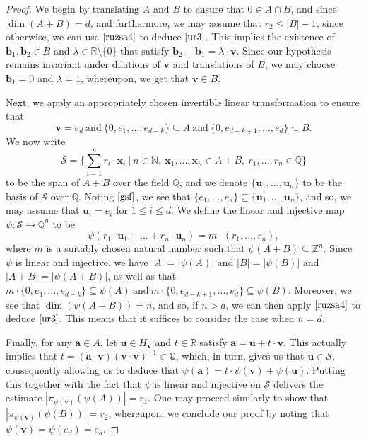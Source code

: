 \documentclass[10pt]{article}
\renewcommand\vec{\bm}
\numberwithin{equation}{section}
\begin{document}
\begin{proof}
 We begin by translating $A$ and $B$ to ensure that $0 \in A \cap B$, and since $\dim(A+B) = d$, and furthermore, we may assume that $r_2 \leq |B| -1$, since otherwise, we can use $\eqref{ruzsa4}$ to deduce $\eqref{ur3}$. This implies the existence of $\vec{b}_1, \vec{b}_2 \in B$ and $\lambda \in \mathbb{R} \setminus \{0\}$ that satisfy $\vec{b}_2 - \vec{b}_1 = \lambda  \cdot \vec{v}$. Since our hypothesis remains invariant under dilations of $\vec{v}$ and translations of $B$, we may choose $\vec{b}_1 = 0$ and $\lambda = 1$, whereupon, we get that $\vec{v} \in B$.
\par

Next, we apply an appropriately chosen invertible linear transformation to ensure that
\begin{equation} \label{gsf}
 \vec{v} = e_d \ \text{and} \ \{0, e_1, \dots, e_{d-k}\} \subseteq A \ \text{and} \ \{0, e_{d-k+1}, \dots, e_{d} \} \subseteq B. 
 \end{equation}
We now write
\[ \mathcal{S} = \big\{ \sum_{i=1}^{n} r_i \cdot \vec{x}_i \ | \ n \in \mathbb{N}, \ \vec{x}_1, \dots, \vec{x}_n \in A+B , \ r_1, \dots, r_n \in \mathbb{Q}\big\}\]
to be the span of $A+B$ over the field $\mathbb{Q}$, and we denote $\{\vec{u}_1, \dots, \vec{u}_n\}$ to be the basis of $\mathcal{S}$ over $\mathbb{Q}$. Noting $\eqref{gsf}$, we see that $\{e_1, \dots, e_d\} \subseteq \{\vec{u}_1, \dots, \vec{u}_n\}$, and so, we may assume that $\vec{u}_i = e_i$ for $1 \leq i \leq d$. We define the linear and injective map $\psi : \mathcal{S} \to \mathbb{Q}^n$ to be 
\[ \psi(r_1 \cdot \vec{u}_1 + \dots + r_n \cdot \vec{u}_n) = m \cdot (r_1, \dots, r_n), \]
where $m$ is a suitably chosen natural number such that $\psi(A+B) \subseteq \mathbb{Z}^n$. Since $\psi$ is linear and injective, we have $|A| = |\psi(A)|$ and $|B| = |\psi(B)|$ and $|A+B| = |\psi(A+B)|$, as well as that $m \cdot \{0, e_1, \dots, e_{d-k} \} \subseteq \psi(A) \ \text{and} \ m \cdot \{0, e_{d-k+1}, \dots, e_{d} \} \subseteq \psi(B).$ Moreover, we see that $\dim(\psi(A+B)) = n$, and so, if $n> d$, we can then apply $\eqref{ruzsa4}$ to deduce $\eqref{ur3}$. This means that it suffices to consider the case when $n = d$.
\par

Finally, for any $\vec{a} \in A$, let $\vec{u} \in H_{\vec{v}}$ and $t \in \mathbb{R}$ satisfy $\vec{a} = \vec{u} + t \cdot \vec{v}$. This actually implies that $t = (\vec{a} \cdot \vec{v} )(\vec{v} \cdot \vec{v})^{-1} \in \mathbb{Q}$, which, in turn, gives us that $\vec{u} \in \mathcal{S}$, consequently allowing us to deduce that $\psi(\vec{a}) = t \cdot \psi(\vec{v}) + \psi(\vec{u})$. Putting this together with the fact that $\psi$ is linear and injective on $\mathcal{S}$ delivers the estimate $|\pi_{\psi(\vec{v})}(\psi(A))| = r_1$. One may proceed similarly to show that $|\pi_{\psi(\vec{v})}(\psi(B))| = r_2$, whereupon, we conclude our proof by noting that $\psi(\vec{v}) = \psi(e_d) = e_d$.
\end{proof}
\end{document}
